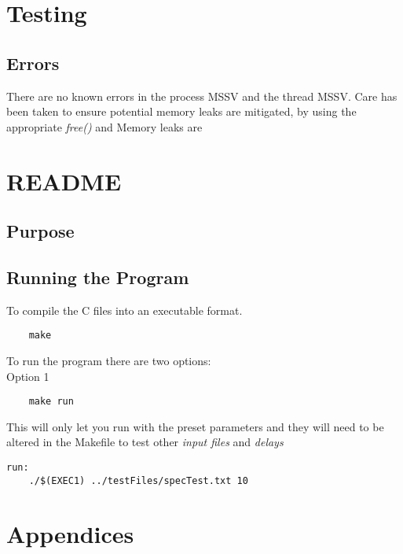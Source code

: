 \documentclass[]{article}
\begin{document}
\section{Testing}

\subsection{Errors}
There are no known errors in the process MSSV and the thread MSSV. Care has been taken to ensure potential memory leaks are mitigated, by using the appropriate \textit{free()} and Memory leaks are 

\pagebreak

\section{README}



\subsection{Purpose}


\subsection{Running the Program}
To compile the C files into an executable format.

\begin{lstlisting}
	make
\end{lstlisting}

To run the program there are two options: \\

Option 1

\begin{lstlisting}
	make run
\end{lstlisting}

This will only let you run with the preset parameters and they will need to be altered in the Makefile to test other \textit{input files} and \textit{delays} \\


\begin{lstlisting}
run:
    ./$(EXEC1) ../testFiles/specTest.txt 10	
\end{lstlisting}


\pagebreak



%
\nocite{*}
\printbibliography
%
\pagebreak
\section{Appendices}
\end{document}
